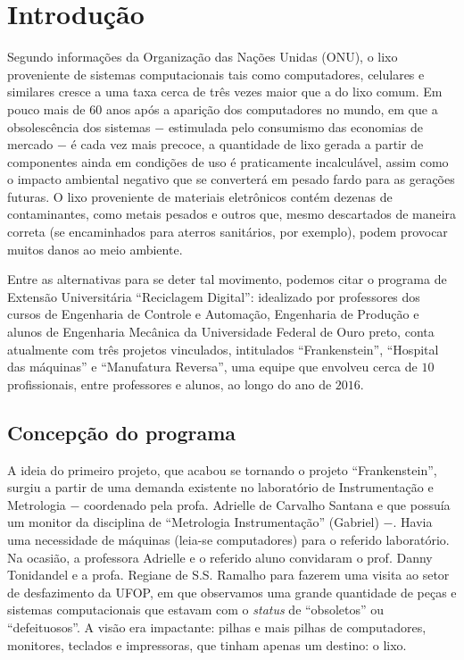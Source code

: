 \documentclass[
	12pt,				%
	openright,			%
	oneside,			%
	a4paper,			%
	english,			%
	spanish,			%
	brazil,				%
	]{abntex2}
\begin{document}
\tableofcontents*
\cleardoublepage


\textual

\chapter{Introdução}
%
Segundo informações da Organização das Nações Unidas (ONU), o lixo proveniente de sistemas computacionais tais como computadores, celulares e similares cresce a uma taxa cerca de três vezes maior que a do lixo comum. Em pouco mais de $60$ anos após a aparição dos computadores no mundo, em que a obsolescência dos sistemas $-$ estimulada pelo consumismo das economias de mercado $-$ é cada vez mais precoce, a quantidade de lixo gerada a partir de componentes ainda em condições de uso é praticamente incalculável, assim como o impacto ambiental negativo que se converterá em pesado fardo para as gerações futuras. O lixo proveniente de materiais eletrônicos contém dezenas de contaminantes, como metais pesados e outros que, mesmo descartados de maneira correta (se encaminhados para aterros sanitários, por exemplo), podem provocar muitos danos ao meio ambiente.

Entre as alternativas para se deter tal movimento, podemos citar o programa de Extensão Universitária ``Reciclagem Digital'': idealizado por professores dos cursos de Engenharia de Controle e Automação, Engenharia de Produção e alunos de Engenharia Mecânica da Universidade Federal de Ouro preto, conta atualmente com três projetos vinculados, intitulados ``Frankenstein'', ``Hospital das máquinas'' e ``Manufatura Reversa'', uma equipe que envolveu cerca de $10$ profissionais, entre professores e alunos, ao longo do ano de $2016$.

\section{Concepção do programa}
A ideia do primeiro projeto, que acabou se tornando o projeto ``Frankenstein'', surgiu a partir de uma demanda existente no laboratório de Instrumentação e Metrologia $-$ coordenado pela profa. Adrielle de Carvalho Santana e que possuía um monitor da disciplina de ``Metrologia Instrumentação'' (Gabriel) $-$. Havia uma necessidade de máquinas (leia-se computadores) para o referido laboratório. Na ocasião, a professora Adrielle e o referido aluno convidaram o prof. Danny Tonidandel e a profa. Regiane de S.S. Ramalho para fazerem uma visita ao setor de desfazimento da UFOP, em que observamos uma grande quantidade de peças e sistemas computacionais que estavam com o \textit{status} de ``obsoletos'' ou ``defeituosos''. A visão era impactante: pilhas e mais pilhas de computadores, monitores, teclados e impressoras, que tinham apenas um destino: o lixo.
\end{document}
